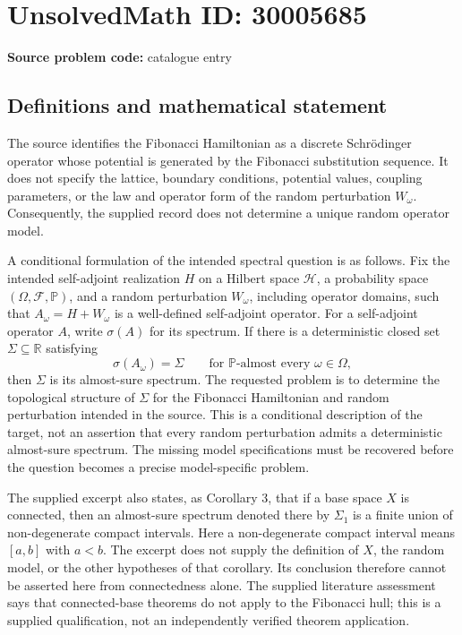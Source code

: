 \documentclass[11pt]{article}
\newcommand{\R}{\mathbb{R}}
\begin{document}
\section*{UnsolvedMath ID: 30005685}
\textbf{Source problem code:} catalogue entry
\subsection{Definitions and mathematical statement}
The source identifies the Fibonacci Hamiltonian as a discrete Schr\"odinger operator whose potential is generated by the Fibonacci substitution sequence. It does not specify the lattice, boundary conditions, potential values, coupling parameters, or the law and operator form of the random perturbation \(W_\omega\). Consequently, the supplied record does not determine a unique random operator model.

A conditional formulation of the intended spectral question is as follows. Fix the intended self-adjoint realization \(H\) on a Hilbert space \(\mathcal H\), a probability space \((\Omega,\mathcal F,\mathbb P)\), and a random perturbation \(W_\omega\), including operator domains, such that \(A_\omega=H+W_\omega\) is a well-defined self-adjoint operator. For a self-adjoint operator \(A\), write \(\sigma(A)\) for its spectrum. If there is a deterministic closed set \(\Sigma\subseteq\R\) satisfying
\[
\sigma(A_\omega)=\Sigma
\qquad\text{for \(\mathbb P\)-almost every \(\omega\in\Omega\)},
\]
then \(\Sigma\) is its almost-sure spectrum. The requested problem is to determine the topological structure of \(\Sigma\) for the Fibonacci Hamiltonian and random perturbation intended in the source. This is a conditional description of the target, not an assertion that every random perturbation admits a deterministic almost-sure spectrum. The missing model specifications must be recovered before the question becomes a precise model-specific problem.

The supplied excerpt also states, as Corollary 3, that if a base space \(X\) is connected, then an almost-sure spectrum denoted there by \(\Sigma_1\) is a finite union of non-degenerate compact intervals. Here a non-degenerate compact interval means \([a,b]\) with \(a<b\). The excerpt does not supply the definition of \(X\), the random model, or the other hypotheses of that corollary. Its conclusion therefore cannot be asserted here from connectedness alone. The supplied literature assessment says that connected-base theorems do not apply to the Fibonacci hull; this is a supplied qualification, not an independently verified theorem application.
\end{document}
